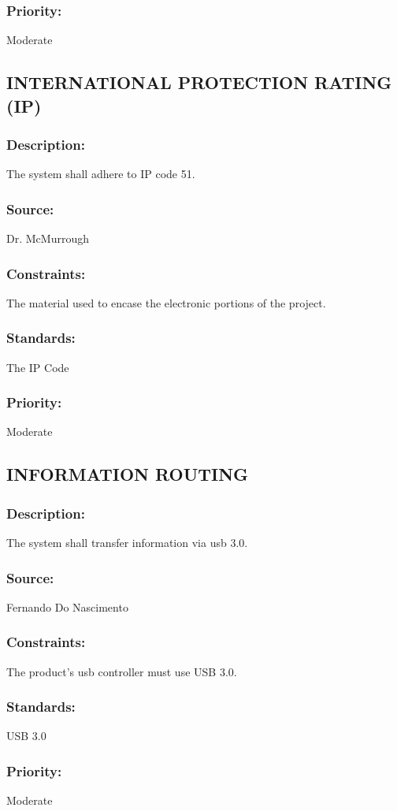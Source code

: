 \subsubsection{Priority:} 
	{Moderate}

\subsection{\text INTERNATIONAL PROTECTION RATING (IP)}
\subsubsection{Description:} 
	{The system shall adhere to IP code 51.}
\subsubsection{Source:} 
	{Dr. McMurrough}
\subsubsection{Constraints:} 
	{The material used to encase the electronic portions of the project.}
\subsubsection{Standards:} 
	{The IP Code}
\subsubsection{Priority:} 
	{Moderate}

\subsection{\text INFORMATION ROUTING }
\subsubsection{Description:} 
	{The system shall transfer information via usb 3.0.}
\subsubsection{Source:} 
	{Fernando Do Nascimento}
\subsubsection{Constraints:} 
	{The product's usb controller must use USB 3.0.}
\subsubsection{Standards:} 
	{USB 3.0}
\subsubsection{Priority:} 
	{Moderate}
